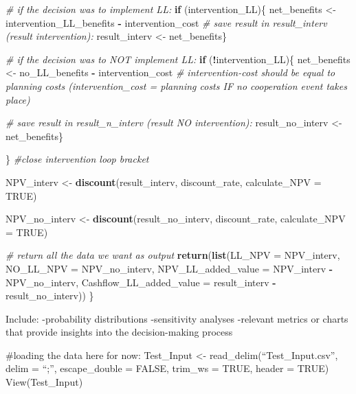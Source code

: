 \documentclass[
]{article}
\newenvironment{Shaded}{\begin{snugshade}}{\end{snugshade}}
\newcommand{\AttributeTok}[1]{\textcolor[rgb]{0.13,0.29,0.53}{#1}}
\newcommand{\CommentTok}[1]{\textcolor[rgb]{0.56,0.35,0.01}{\textit{#1}}}
\newcommand{\ConstantTok}[1]{\textcolor[rgb]{0.56,0.35,0.01}{#1}}
\newcommand{\ControlFlowTok}[1]{\textcolor[rgb]{0.13,0.29,0.53}{\textbf{#1}}}
\newcommand{\FunctionTok}[1]{\textcolor[rgb]{0.13,0.29,0.53}{\textbf{#1}}}
\newcommand{\NormalTok}[1]{#1}
\newcommand{\OtherTok}[1]{\textcolor[rgb]{0.56,0.35,0.01}{#1}}
\newcommand{\SpecialCharTok}[1]{\textcolor[rgb]{0.81,0.36,0.00}{\textbf{#1}}}
\begin{document}
\begin{Shaded}
\begin{Highlighting}[]
  
  \CommentTok{\# if the decision was to implement LL:}
  \ControlFlowTok{if}\NormalTok{ (intervention\_LL)\{}
\NormalTok{    net\_benefits }\OtherTok{\textless{}{-}}\NormalTok{ intervention\_LL\_benefits }\SpecialCharTok{{-}}\NormalTok{ intervention\_cost}
    \CommentTok{\# save result in result\_interv (result intervention):}
\NormalTok{    result\_interv }\OtherTok{\textless{}{-}}\NormalTok{ net\_benefits\}}
  
  
  \CommentTok{\# if the decision was to NOT implement LL:}
  \ControlFlowTok{if}\NormalTok{ (}\SpecialCharTok{!}\NormalTok{intervention\_LL)\{}
\NormalTok{    net\_benefits }\OtherTok{\textless{}{-}}\NormalTok{ no\_LL\_benefits }\SpecialCharTok{{-}}\NormalTok{ intervention\_cost  }
    \CommentTok{\# intervention{-}cost should be equal to planning costs (intervention\_cost = planning costs IF no cooperation event takes place)}
    
    \CommentTok{\# save result in result\_n\_interv (result NO intervention):}
\NormalTok{    result\_no\_interv }\OtherTok{\textless{}{-}}\NormalTok{ net\_benefits\}}
  
  
\NormalTok{    \} }\CommentTok{\#close intervention loop bracket}
  
\NormalTok{  NPV\_interv }\OtherTok{\textless{}{-}}
  \FunctionTok{discount}\NormalTok{(result\_interv, discount\_rate, }\AttributeTok{calculate\_NPV =} \ConstantTok{TRUE}\NormalTok{)}

\NormalTok{  NPV\_no\_interv }\OtherTok{\textless{}{-}}
  \FunctionTok{discount}\NormalTok{(result\_no\_interv, discount\_rate, }\AttributeTok{calculate\_NPV =} \ConstantTok{TRUE}\NormalTok{)}

\CommentTok{\# return all the data we want as output}
\FunctionTok{return}\NormalTok{(}\FunctionTok{list}\NormalTok{(}\AttributeTok{LL\_NPV =}\NormalTok{ NPV\_interv,}
            \AttributeTok{NO\_LL\_NPV =}\NormalTok{ NPV\_no\_interv,}
            \AttributeTok{NPV\_LL\_added\_value =}\NormalTok{ NPV\_interv }\SpecialCharTok{{-}}\NormalTok{ NPV\_no\_interv,}
            \AttributeTok{Cashflow\_LL\_added\_value =}\NormalTok{ result\_interv }\SpecialCharTok{{-}}\NormalTok{ result\_no\_interv))}
\NormalTok{\}}
\end{Highlighting}
\end{Shaded}

Include: -probability distributions -sensitivity analyses -relevant
metrics or charts that provide insights into the decision-making process

\#loading the data here for now: Test\_Input \textless-
read\_delim(``Test\_Input.csv'', delim = ``;'', escape\_double = FALSE,
trim\_ws = TRUE, header = TRUE) View(Test\_Input)
\end{document}
